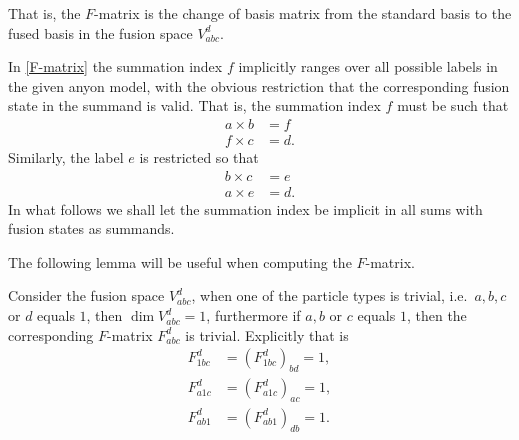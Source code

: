 That is, the $F$-matrix is the change of basis matrix from the standard basis to the fused basis in the fusion space $V_{abc}^d$.

\begin{remark}\label{rem:sum index range}
  In \cref{F-matrix} the summation index $f$ implicitly ranges over all possible labels in the given anyon model, with the obvious restriction that the corresponding fusion state in the summand is valid. That is, the summation index $f$ must be such that
  \begin{equation}
    \begin{aligned}
      a \times b &= f \\
      f \times c &= d.
    \end{aligned}
  \end{equation}
  Similarly, the label $e$ is restricted so that
  \begin{equation}
    \begin{aligned}
      b \times c &= e \\
      a \times e &= d.
    \end{aligned}
  \end{equation}
  In what follows we shall let the summation index be implicit in all sums with fusion states as summands.
\end{remark}

The following lemma will be useful when computing the $F$-matrix.

\begin{lemma}\label{res:F1}
  Consider the fusion space $V_{abc}^d$, when one of the particle types is trivial, i.e.\ $a,b,c$ or $d$ equals $1$, then $\dim V_{abc}^d = 1$, furthermore if $a,b$ or $c$ equals $1$, then the corresponding $F$-matrix $F_{abc}^d$ is trivial. Explicitly that is
  \begin{equation}
    \begin{aligned}
      F_{1bc}^d &= \left( F_{1bc}^d \right)_{bd} = 1, \\
      F_{a1c}^d &= \left( F_{a1c}^d \right)_{ac} = 1, \\
      F_{ab1}^d &= \left( F_{ab1}^d \right)_{db} = 1.
    \end{aligned}
  \end{equation}
\end{lemma}

